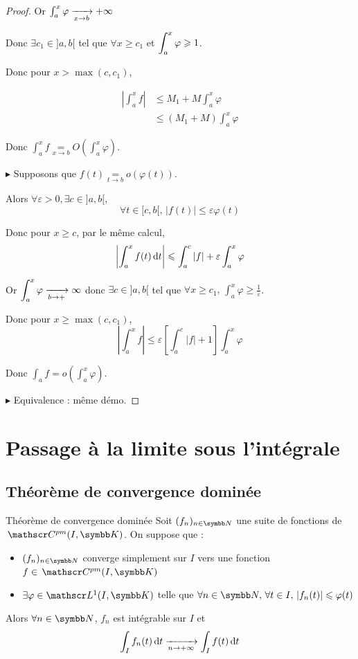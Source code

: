 \begin{proof}
    Or $\int_{a }^{x } \varphi \xrightarrow[x \to b]{} + \infty$

    Donc $\exists c_1 \in ]a, b[$ tel que $\forall x \geqslant c_1$ et $\displaystyle \int_{a }^{x } \varphi \geqslant 1$. 

    Donc pour $x > \max (c, c_1)$, 

    \begin{align}
        \left| \int_{a }^{x } f \right| & \leqslant M_1 + M \int_{a }^{x } \varphi \\
        & \leqslant (M_1 + M) \int_{a }^{x } \varphi
    \end{align}

    Donc $\int_{a }^{x } f \underset{x \to b }{=} O\left( \int_{a }^{x } \varphi \right)$.

    $\blacktriangleright$ Supposons que $f(t) \underset{t \to b }{= } o(\varphi(t))$. 

    Alors $\forall \varepsilon > 0, \exists c \in ]a, b[$, 
    $$\forall t \in [c, b[, \, |f(t)| \leqslant \varepsilon \varphi(t)$$

    Donc pour $x \geqslant c$, par le même calcul, 
    $$\left| \int_{a }^{x } f(t) \,\mathrm{d}t \right| \leqslant \int_a^c | f| + \varepsilon \int_a^x \varphi$$

    Or $\displaystyle \int_a^x \varphi \xrightarrow[b \to +]{} \infty$ donc $\exists c \in ]a, b[$ tel que 
    $\forall x \geqslant c_1, \, \int_a^x \varphi \geqslant \frac 1 \varepsilon$.

    Donc pour $x \geqslant \max (c, c_1)$,
    $$\left| \int_a^x f \right| \leqslant \varepsilon \left[ \int_a^c |f| + 1 \right] \int_a^x \varphi$$

    Donc $\int_a f = o\left( \int_a^x \varphi \right)$.

    $\blacktriangleright$ Equivalence : même démo. 
\end{proof}


\section{Passage à la limite sous l'intégrale}
\subsection{Théorème de convergence dominée }

\begin{theoreme}{Théorème de convergence dominée}{}
    Soit $(f_n)_{n \in \N}$ une suite de fonctions de $\mc {pm}(I, \K)$. On suppose que :
    \begin{itemize}
        \item $(f_n)_{n \in \N}$ converge simplement sur $I$ vers une fonction $f \in \mc {pm}(I, \K)$
        \item $\exists \varphi \in \mathscr L^1(I, \K)$ telle que 
        $\forall n \in \N, \, \forall t \in I, \, |f_n(t)| \leqslant \varphi(t)$
    \end{itemize}
    Alors 
    $\forall n \in \N$, $f_n$ est intégrable sur $I$ et 
    $$\int_I f_n(t) \,\mathrm{d}t \xrightarrow[n \to + \infty]{} \int_I f(t) \,\mathrm{d}t$$
\end{theoreme}

